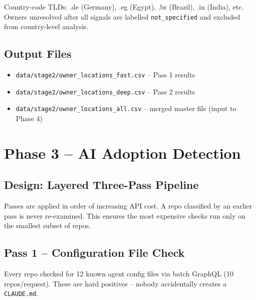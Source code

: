 \documentclass[12pt,a4paper]{article}
\begin{document}
Country-code TLDs: .de (Germany), .eg (Egypt), .br (Brazil), .in (India), etc.
Owners unresolved after all signals are labelled \texttt{not\_specified} and excluded
from country-level analysis.

\subsection{Output Files}
\begin{itemize}
  \item \texttt{data/stage2/owner\_locations\_fast.csv} -- Pass 1 results
  \item \texttt{data/stage2/owner\_locations\_deep.csv} -- Pass 2 results
  \item \texttt{data/stage2/owner\_locations\_all.csv} -- merged master file (input to Phase 4)
\end{itemize}

\section{Phase 3 -- AI Adoption Detection}

\subsection{Design: Layered Three-Pass Pipeline}

Passes are applied in order of increasing API cost. A repo classified by an earlier
pass is never re-examined. This ensures the most expensive checks run only on the
smallest subset of repos.

\subsection{Pass 1 -- Configuration File Check}

Every repo checked for 12 known agent config files via batch GraphQL (10 repos/request).
These are hard positives -- nobody accidentally creates a \texttt{CLAUDE.md}.
\end{document}
